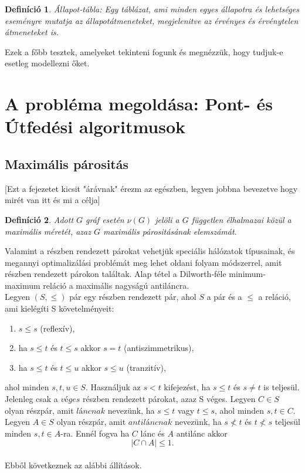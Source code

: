 \documentclass[12pt]{article}
\newtheorem{defin}{Definíció}[section]
\begin{document}
\begin{defin}
Állapot-tábla: Egy táblázat, ami minden egyes állapotra és lehetséges eseményre mutatja az állapotátmeneteket, megjelenitve az érvényes és érvénytelen átmeneteket is. ~\cite{htb:masterfield}
\end{defin}

Ezek a főbb tesztek, amelyeket tekinteni fogunk és megnézzük, hogy tudjuk-e esetleg modellezni őket.\\
\pagebreak

\section{A probléma megoldása: Pont- és Útfedési algoritmusok}
\subsection{Maximális párositás}
[Ezt a fejezetet kicsit "árávnak" érezm az egészben, legyen jobbna bevezetve hogy mirét van itt és mi a célja]

\begin{defin}
Adott $G$ gráf esetén $\nu(G)$ jelöli a $G$ független élhalmazai közül a maximális méretét, azaz $G$ maximális párositásának elemszámát. ~\cite{szam:Fleiner}
\end{defin}

Valamint a részben rendezett párokat vehetjük speciális hálózatok típusainak, és megannyi optimalizálási problémát meg lehet oldani folyam módszerrel, amit részben rendezett párokon találtak. Alap tétel a Dilworth-féle minimum-maximum reláció a maximális nagyságú antiláncra. \\

Legyen $(S,\leq)$ pár egy részben rendezett pár, ahol $S$ a pár és a  $\leq$ a reláció, ami kielégíti S követelményeit:
\begin{enumerate}
\item$s \leq s$ (reflexív),
\item ha $s \leq t$ és $t \leq s$ akkor $s = t$ (antiszimmetrikus),
\item ha $s \leq t$ és $t \leq u$ akkor $s \leq u$ (tranzitív),
\end{enumerate}
ahol minden $s,t,u \in S$. Használjuk az $s < t$ kifejezést, ha $s \leq t$ és $s \neq t$ is teljesül. Jelenleg csak a $véges$ részben rendezett párokat, azaz S véges.
Legyen $C \in S$ olyan részpár, amit $láncnak$ nevezünk, ha $s \leq t$ vagy $t \leq s$, ahol minden $s,t \in C$. Legyen $A \in S$ olyan részpár, amit $antiláncnak$ nevezünk, ha $s \nless t$ és $t \nless s$ teljesül minden $s,t 
\in A$-ra. Ennél fogva ha $C$ lánc és $A$ antilánc akkor
$$|C \cap A| \leq 1.$$\\
Ebből következnek az alábbi állítások. ~\cite{bomze1999maximum}\\
\end{document}
